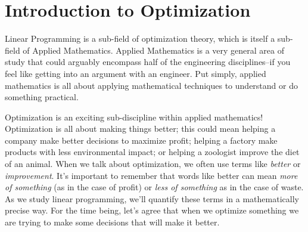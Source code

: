\chapter{Introduction to Optimization}
Linear Programming is a sub-field of optimization theory, which is itself a sub-field of Applied Mathematics. Applied Mathematics is a very general area of study that could arguably encompass half of the engineering disciplines--if you feel like getting into an argument with an engineer. Put simply, applied mathematics is all about applying mathematical techniques to understand or do something practical. 

Optimization is an exciting sub-discipline within applied mathematics! Optimization is all about making things better; this could mean helping a company make better decisions to maximize profit; helping a factory make products with less environmental impact; or helping a zoologist improve the diet of an animal. When we talk about optimization, we often use terms like \textit{better} or \textit{improvement}. It's important to remember that words like better can mean \textit{more of something} (as in the case of profit) or \textit{less of something} as in the case of waste. As we study linear programming, we'll quantify these terms in a mathematically precise way. For the time being, let's agree that when we optimize something we are trying to make some decisions that will make it better.

